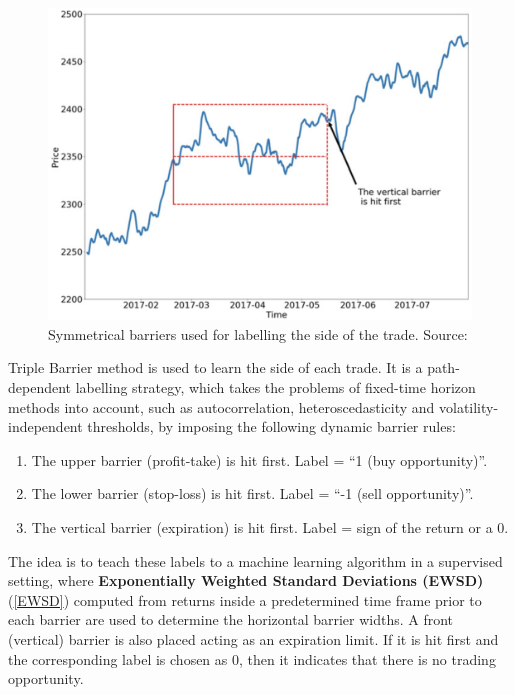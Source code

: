 \documentclass{article}
\begin{document}
\begin{figure}[!htbp]
     \centering
     \includegraphics[scale=0.28]{3bar.png}
     \caption{Symmetrical barriers used for labelling the side of the trade. Source: \cite{advances_in_ml}}
\end{figure}

Triple Barrier method is used to learn the side of each trade. It is a path-dependent labelling strategy, which takes the problems of fixed-time horizon methods into account, such as autocorrelation, heteroscedasticity and volatility-independent thresholds, by imposing the following dynamic barrier rules:

\begin{enumerate}
    \item The upper barrier (profit-take) is hit first. Label = “1 (buy opportunity)”.
    
    \item The lower barrier (stop-loss) is hit first. Label = “-1 (sell opportunity)”.
    
    \item The vertical barrier (expiration) is hit first. Label = sign of the return or a 0.
\end{enumerate}

The idea is to teach these labels to a machine learning algorithm in a supervised setting, where \textbf{Exponentially Weighted Standard Deviations (EWSD)} (\ref{EWSD}) computed from returns inside a predetermined time frame prior to each barrier are used to determine the horizontal barrier widths. A front (vertical) barrier is also placed acting as an expiration limit. If it is hit first and the corresponding label is chosen as 0, then it indicates that there is no trading opportunity.
\end{document}
